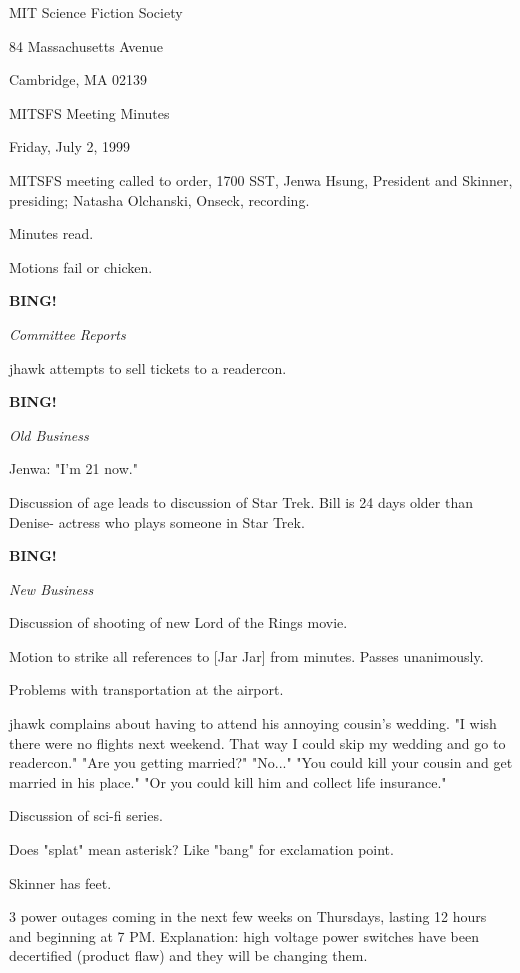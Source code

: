 \documentclass[12pt]{article}
\newcommand{\bing}{{\bf BING!} }
\newcommand{\goto}[1]{\bing \vskip 12pt \centerline{{\em{#1}}}}
\begin{document}
\begin{center}

MIT Science Fiction Society 

84 Massachusetts Avenue

Cambridge, MA 02139

\vspace{12pt}

MITSFS Meeting Minutes 

Friday, July 2, 1999

\end{center}
 
\vspace{18pt}

\setlength{\parskip}{6pt}

\noindent
MITSFS meeting called to order, 1700 SST,
Jenwa Hsung, President and Skinner, presiding; Natasha Olchanski, Onseck, recording.

Minutes read.

Motions fail or chicken.

\goto{Committee Reports}

jhawk attempts to sell tickets to a readercon.

\goto{Old Business}

Jenwa: "I'm 21 now."

Discussion of age leads to discussion of Star Trek. Bill is 24 days older than Denise- actress who plays someone in Star Trek.

\goto{New Business}

Discussion of shooting of new Lord of the Rings movie.

Motion to strike all references to [Jar Jar] from minutes. Passes unanimously.

Problems with transportation at the airport.

jhawk complains about having to attend his annoying cousin's wedding. "I wish there were no flights next weekend. That way I could skip my wedding and go to readercon." "Are you getting married?" "No..." "You could kill your cousin and get married in his place." "Or you could kill him and collect life insurance."

Discussion of sci-fi series.

Does "splat" mean asterisk? Like "bang" for exclamation point.

Skinner has feet.

3 power outages coming in the next few weeks on Thursdays, lasting 12 hours and beginning at 7 PM. Explanation: high voltage power switches have been decertified (product flaw) and they will be changing them.
\end{document}
